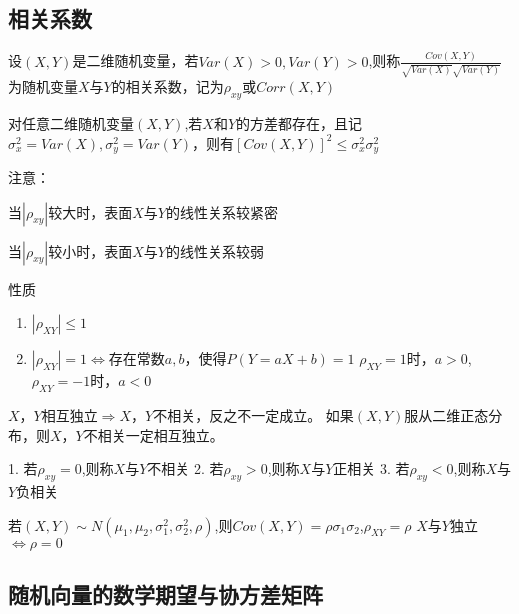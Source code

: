     \subsection{相关系数}
    \begin{definition}
        设$(X,Y)$是二维随机变量，若$Var(X) > 0,Var(Y) > 0$,则称$\frac{{Cov(X,Y)}}{{\sqrt {Var(X)} \sqrt {Var(Y)} }}$为随机变量$X$与$Y$的相关系数，记为$\rho_{xy}$或$Corr(X,Y)$
    \end{definition}

    \begin{lemma}
        对任意二维随机变量$(X,Y)$,若$X$和$Y$的方差都存在，且记$\sigma_x^2=Var(X),\sigma_y^2=Var(Y)$，则有$[Cov(X,Y)]^2 \leqslant \sigma_x^2 \sigma_y^2$
    \end{lemma}

    注意：

    当$|\rho_{xy}|$较大时，表面$X$与$Y$的线性关系较紧密

    当$|\rho_{xy}|$较小时，表面$X$与$Y$的线性关系较弱

\begin{property} 性质
    \begin{enumerate}
        \item $\left| {{\rho _{XY}}} \right| \leqslant 1$
        \item $\left| {{\rho _{XY}}} \right| = 1 \Leftrightarrow $存在常数$a,b$，使得$P(Y = aX + b) = 1$
              $\rho_{XY}=1$时，$a>0$,$\rho_{XY}=-1$时，$a<0$
    \end{enumerate}

\end{property}

\begin{theorem}
    $X$，$Y$相互独立$\Rightarrow$$X$，$Y$不相关，反之不一定成立。
        如果$(X,Y)$服从二维正态分布，则$X$，$Y$不相关一定相互独立。
\end{theorem}


\begin{theorem}
    1. 若$\rho_{xy}=0$,则称$X$与$Y$不相关
    2. 若$\rho_{xy}>0$,则称$X$与$Y$正相关
    3. 若$\rho_{xy}<0$,则称$X$与$Y$负相关
\end{theorem}


\begin{theorem}
    若$(X,Y) \sim N({\mu _1},{\mu _2},\sigma _1^2,\sigma _2^2,\rho )$,则$Cov(X,Y) = \rho {\sigma _1}{\sigma _2}$,${\rho _{XY}} = \rho $
$X$与$Y$独立$\Leftrightarrow \rho=0$
\end{theorem}
\subsection{随机向量的数学期望与协方差矩阵}

